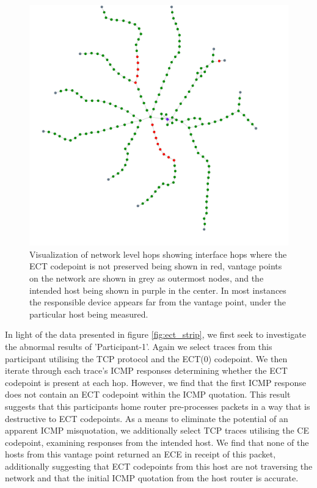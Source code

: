 \documentclass{l4proj}
\begin{document}
\begin{figure}[H]
    \centering
    \includegraphics[scale=0.1]{dissertation/images/hops.pdf}
    \caption{Visualization of network level hops showing interface hops where the ECT codepoint is not preserved being shown in red, vantage points on the network are shown in grey as outermost nodes, and the intended host being shown in purple in the center. In most instances the responsible device appears far from the vantage point, under the particular host being measured.}
    \label{fig:traces}
\end{figure}

In light of the data presented in figure \ref{fig:ect_strip}, we first seek to investigate the abnormal results of 'Participant-1'. Again we select traces from this participant utilising the TCP protocol and the ECT(0) codepoint. We then iterate through each trace's ICMP responses determining whether the ECT codepoint is present at each hop. However, we find that the first ICMP response does not contain an ECT codepoint within the ICMP quotation. This result suggests that this participants home router pre-processes packets in a way that is destructive to ECT codepoints. As a means to eliminate the potential of an apparent ICMP misquotation, we additionally select TCP traces utilising the CE codepoint, examining responses from the intended host. We find that none of the hosts from this vantage point returned an ECE in receipt of this packet, additionally suggesting that ECT codepoints from this host are not traversing the network and that the initial ICMP quotation from the host router is accurate.
\end{document}
